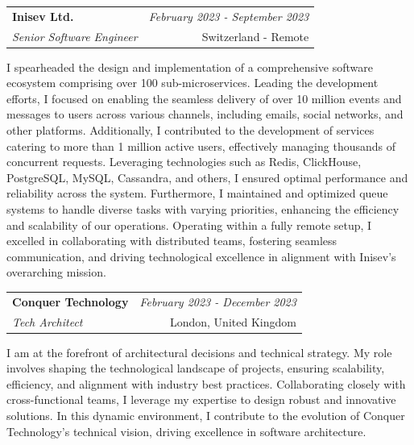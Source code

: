 \documentclass[a4paper,10pt]{article}
\makeatletter
\newcommand{\resumeSubheading}[4]{
	\vspace{0.5mm}\item
	\begin{tabular*}{0.98\textwidth}[t]{l@{\extracolsep{\fill}}r}
		\textbf{#1} & \textit{\footnotesize{#4}} \\
		\textit{\footnotesize{#3}} &  \footnotesize{#2}\\
	\end{tabular*}
	\vspace{-2.4mm}
}
\newcommand{\resumeItemListStart}{\begin{justify}\begin{itemize}[leftmargin=3ex, rightmargin=2ex, noitemsep,labelsep=1.2mm,itemsep=0mm]\small}
\newcommand{\resumeItemListEnd}{\end{itemize}\end{justify}\vspace{-2mm}}
\makeatother
\begin{document}
\vspace{-1mm}
\resumeSubheading
{Inisev Ltd.}{Switzerland - Remote}
{Senior Software Engineer}{February 2023 - September 2023}
\resumeItemListStart
I spearheaded the design and implementation of a comprehensive software ecosystem comprising over 100 sub-microservices. Leading the development efforts, I focused on enabling the seamless delivery of over 10 million events and messages to users across various channels, including emails, social networks, and other platforms. Additionally, I contributed to the development of services catering to more than 1 million active users, effectively managing thousands of concurrent requests. Leveraging technologies such as Redis, ClickHouse, PostgreSQL, MySQL, Cassandra, and others, I ensured optimal performance and reliability across the system. Furthermore, I maintained and optimized queue systems to handle diverse tasks with varying priorities, enhancing the efficiency and scalability of our operations. Operating within a fully remote setup, I excelled in collaborating with distributed teams, fostering seamless communication, and driving technological excellence in alignment with Inisev's overarching mission.
\resumeItemListEnd

\vspace{-1mm}
\resumeSubheading
{Conquer Technology}{London, United Kingdom}
{Tech Architect}{February 2023 - December 2023}
\resumeItemListStart
I am at the forefront of architectural decisions and technical strategy. My role involves shaping the technological landscape of projects, ensuring scalability, efficiency, and alignment with industry best practices. Collaborating closely with cross-functional teams, I leverage my expertise to design robust and innovative solutions. In this dynamic environment, I contribute to the evolution of Conquer Technology's technical vision, driving excellence in software architecture.
\resumeItemListEnd
\end{document}
